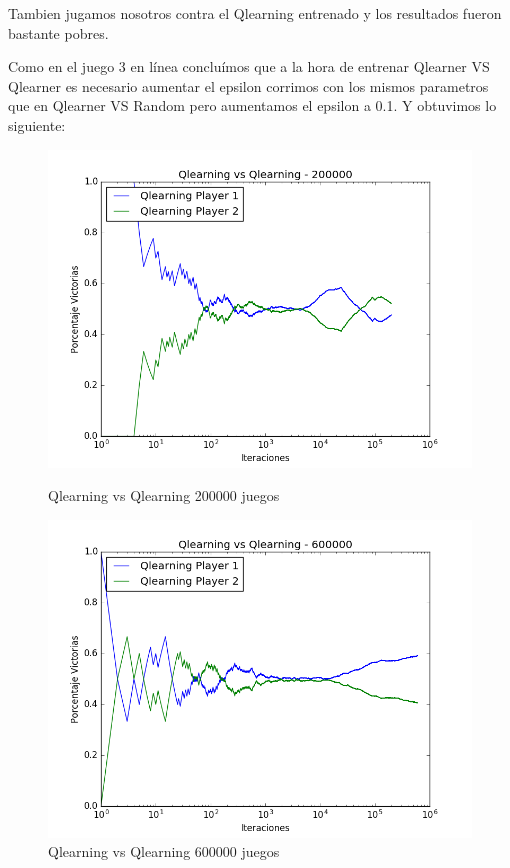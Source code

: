 Tambien jugamos nosotros contra el Qlearning entrenado y los resultados fueron bastante pobres.

Como en el juego 3 en línea concluímos que a la hora de entrenar Qlearner VS Qlearner es necesario aumentar el epsilon corrimos con los mismos parametros que en Qlearner VS Random pero aumentamos el epsilon a 0.1. Y obtuvimos lo siguiente:

\begin{figure}[h]
 \centering
 \begin{minipage}{.45\textwidth}
	\centering
	\includegraphics[scale=0.35]{resultados/7x6/QlearningVsQlearning_200000_7x6_parametros_informe.png}
       \caption{Qlearning vs Qlearning 200000 juegos}
  \end{minipage}
 \begin{minipage}{.5\textwidth}
	\centering
	\includegraphics[scale=0.35]{resultados/7x6/QlearningVsQlearning_600000_7x6_parametros_informe.png}
        \caption{Qlearning vs Qlearning 600000 juegos}
  \end{minipage}
\end{figure}

